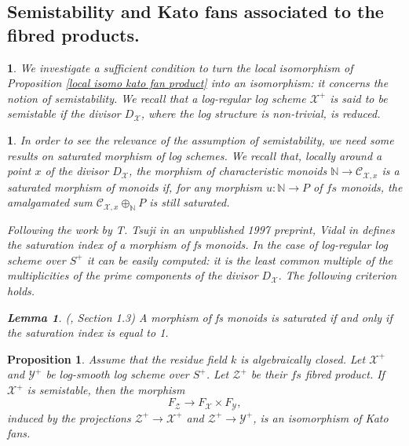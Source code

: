 \documentclass{amsart}%
\numberwithin{equation}{subsection}
\theoremstyle{plain2}
\newtheorem{lemma}[equation]{Lemma}
\newtheorem{prop}[equation]{Proposition}
\theoremstyle{definition2}
\theoremstyle{stepstyle}
\theoremstyle{point}
\theoremstyle{subpoint}
\newtheorem{subpoint}[equation]{}%
\newcommand{\spa}[1]{\begin{subpoint}#1\end{subpoint}}           %
\newcommand{\N}{\ensuremath{\mathbb{N}}}
\newcommand{\cX}{\ensuremath{\mathscr{X}}}
\newcommand{\caC}{\ensuremath{\mathcal{C}}}
\newcommand{\cY}{\ensuremath{\mathscr{Y}}}
\newcommand{\cZ}{\ensuremath{\mathscr{Z}}}
\renewcommand{\cZ}{\ensuremath{\mathscr{Z}}}
\renewcommand{\cY}{\ensuremath{\mathscr{Y}}}
\begin{document}
\subsection{Semistability and Kato fans associated to the fibred products.} 
\spa{We investigate a sufficient condition to turn the local isomorphism of Proposition \ref{local isomo kato fan product} into an isomorphism: it concerns the notion of semistability. We recall that a log-regular log scheme $\cX^+$ is said to be semistable if the divisor $D_{\cX}$, where the log structure is non-trivial, is reduced.}

\spa{In order to see the relevance of the assumption of semistability, we need some results on saturated morphism of log schemes. We recall that, locally around a point $x$ of the divisor $D_{\cX}$, the morphism of characteristic monoids $\N \rightarrow \caC_{\cX,x}$ is a saturated morphism of monoids if, for any morphism $u: \N \rightarrow P$ of $fs$ monoids, the amalgamated sum $\caC_{\cX,x} \oplus_{\N} P$ is still saturated.

Following the work by T. Tsuji in an unpublished 1997 preprint, Vidal in \cite{Vidal} defines the saturation index of a morphism of \emph{fs} monoids. In the case of log-regular log scheme over $S^+$ it can be easily computed: it is the least common multiple of the multiplicities of the prime components of the divisor $D_{\cX}$. The following criterion holds.
\begin{lemma} \label{lemma criterion saturation}(\cite{Vidal}, Section 1.3)
A morphism of fs monoids is saturated if and only if the saturation index is equal to 1.
\end{lemma}}

\begin{prop} \label{prop semistability and iso Kato fans}
Assume that the residue field $k$ is algebraically closed. Let $\cX^+$ and $\cY^+$ be log-smooth log scheme over $S^+$. Let $\cZ^+$ be their $fs$ fibred product. If $\cX^+$ is semistable, then the morphism $$F_{\cZ}\xrightarrow{} F_{\cX} \times F_{\cY},$$ induced by the projections $\cZ^+ \rightarrow \cX^+$ and $\cZ^+ \rightarrow \cY^+$, is an isomorphism of Kato fans.
\end{prop}
\end{document}
